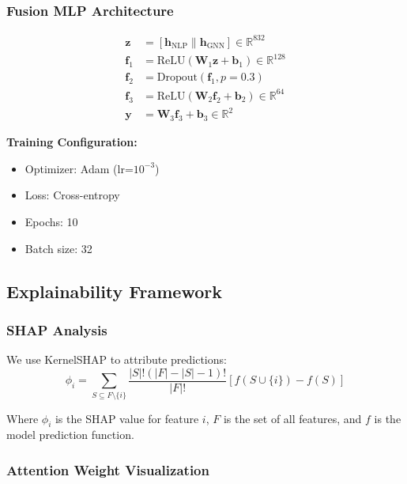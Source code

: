 \subsubsection{Fusion MLP Architecture}

\begin{align}
\mathbf{z} &= [\mathbf{h}_{\text{NLP}} \| \mathbf{h}_{\text{GNN}}] \in \mathbb{R}^{832} \\
\mathbf{f}_1 &= \text{ReLU}(\mathbf{W}_1 \mathbf{z} + \mathbf{b}_1) \in \mathbb{R}^{128} \\
\mathbf{f}_2 &= \text{Dropout}(\mathbf{f}_1, p=0.3) \\
\mathbf{f}_3 &= \text{ReLU}(\mathbf{W}_2 \mathbf{f}_2 + \mathbf{b}_2) \in \mathbb{R}^{64} \\
\mathbf{y} &= \mathbf{W}_3 \mathbf{f}_3 + \mathbf{b}_3 \in \mathbb{R}^{2}
\end{align}

\textbf{Training Configuration:}
\begin{itemize}
    \item Optimizer: Adam (lr=$10^{-3}$)
    \item Loss: Cross-entropy
    \item Epochs: 10
    \item Batch size: 32
\end{itemize}

\subsection{Explainability Framework}

\subsubsection{SHAP Analysis}

We use KernelSHAP \cite{lundberg2017unified} to attribute predictions:
\begin{equation}
\phi_i = \sum_{S \subseteq F \setminus \{i\}} \frac{|S|!(|F|-|S|-1)!}{|F|!} [f(S \cup \{i\}) - f(S)]
\end{equation}

Where $\phi_i$ is the SHAP value for feature $i$, $F$ is the set of all features, and $f$ is the model prediction function.

\subsubsection{Attention Weight Visualization}

